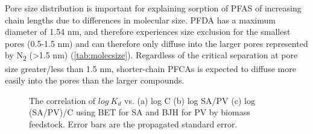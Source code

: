 Pore size distribution is important for explaining sorption of PFAS of increasing chain lengths due to differences in molecular size. PFDA has a maximum diameter of 1.54 nm, and therefore experiences size exclusion for the smallest pores (0.5-1.5 nm) and can therefore only diffuse into the larger pores represented by N\textsubscript{2} (\textgreater 1.5 nm) (\cref{tab:molecsize}). Regardless of the critical separation at pore size greater/less than 1.5 nm, shorter-chain PFCAs is expected to diffuse more easily into the pores than the larger compounds.  

\begin{figure}[!ht]
\hfill
{}
\hfill
{}
\caption{The correlation of $log~K_d$ vs. (a) log C (b) log SA/PV (c) log (SA/PV)/C using BET for SA and BJH for PV by biomass feedstock. Error bars are the propagated standard error.}
\label{fig:Kd_SAPV_C}
\end{figure}

